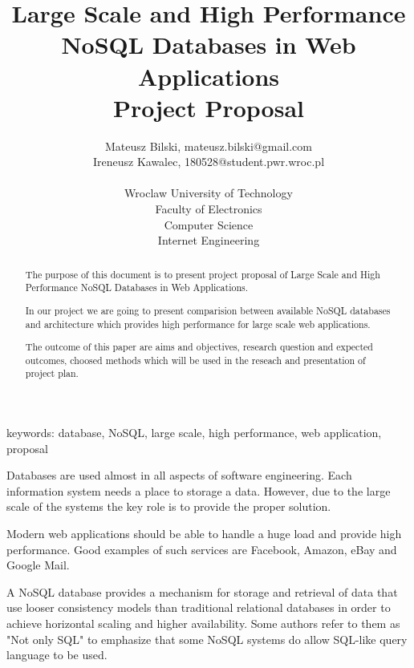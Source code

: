 \documentclass[times, 10pt,twocolumn]{article}
\begin{document}
 

\title{Large Scale and High Performance NoSQL Databases in Web Applications \\ Project Proposal}
\author{Mateusz Bilski, mateusz.bilski@gmail.com \\ Ireneusz Kawalec, 180528@student.pwr.wroc.pl \\ \\
Wroclaw University of Technology\\ Faculty of Electronics \\ Computer Science \\ Internet Engineering  \\  
} 

\maketitle
\thispagestyle{empty} 

\begin{abstract}  

The purpose of this document is to present project proposal of Large Scale and High Performance NoSQL Databases in Web Applications. 

In our project we are going to present comparision between available NoSQL databases and architecture which
provides high performance for large scale web applications.

The outcome of this paper are aims and objectives, research question and expected outcomes, choosed methods which will be used in the reseach
and presentation of project plan. 

\end{abstract} 

keywords: database, NoSQL, large scale, high performance, web application, proposal


Databases are used almost in all aspects of software engineering. Each 
information system needs a place to storage a data. However, due to the large scale of the systems 
the key role is to provide the proper solution.

Modern web applications should be able to handle a huge load and provide high performance. 
Good examples of such services are Facebook, Amazon, eBay and Google Mail.

A NoSQL database provides a mechanism for storage and retrieval of data that use looser consistency models 
than traditional relational databases in order to achieve horizontal scaling and higher availability. Some authors 
refer to them as "Not only SQL" to emphasize that some NoSQL systems do allow SQL-like query language to be used.
\end{document}
